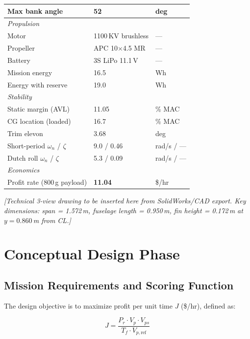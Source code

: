 \documentclass[10pt]{article}
\begin{document}
\begin{table}[H]
\begin{tabular}{lll}
Max bank angle & 52 & deg \\
\midrule
\multicolumn{3}{l}{\textit{Propulsion}} \\
Motor & 1100\,KV brushless & --- \\
Propeller & APC 10$\times$4.5 MR & --- \\
Battery & 3S LiPo 11.1\,V & --- \\
Mission energy & 16.5 & Wh \\
Energy with reserve & 19.0 & Wh \\
\midrule
\multicolumn{3}{l}{\textit{Stability}} \\
Static margin (AVL) & 11.05 & \% MAC \\
CG location (loaded) & 16.7 & \% MAC \\
Trim elevon & 3.68 & deg \\
Short-period $\omega_n$ / $\zeta$ & 9.0 / 0.46 & rad/s / --- \\
Dutch roll $\omega_n$ / $\zeta$ & 5.3 / 0.09 & rad/s / --- \\
\midrule
\multicolumn{3}{l}{\textit{Economics}} \\
Profit rate (800\,g payload) & \textbf{11.04} & \$/hr \\
\bottomrule
\end{tabular}
\end{table}

\noindent\textit{[Technical 3-view drawing to be inserted here from SolidWorks/CAD export.
Key dimensions: span = 1.572\,m, fuselage length = 0.950\,m,
fin height = 0.172\,m at $y = 0.860$\,m from CL.]}

\section{Conceptual Design Phase}

\subsection{Mission Requirements and Scoring Function}

The design objective is to maximize profit per unit time $J$ (\$/hr), defined as:

\begin{equation}
J = \frac{P_r \cdot V_p \cdot V_{ps}}{T_f \cdot V_{p,\text{ref}}}
\end{equation}
\end{document}
